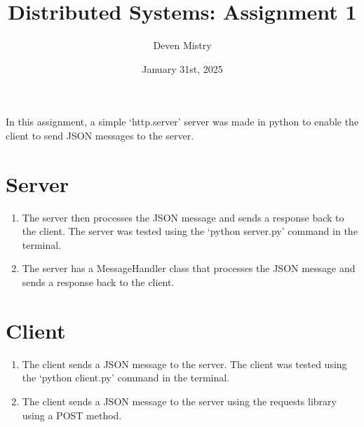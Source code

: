 \documentclass{article}
\title{Distributed Systems: Assignment 1}
\author{Deven Mistry}
\date{January 31st, 2025}
\begin{document}
\maketitle

In this assignment, a simple `http.server' server was made in python to enable the client to send JSON messages to the server.

\section*{Server}

\begin{enumerate}
    \item The server then processes the JSON message and sends a response back to the client. The server was tested using the `python server.py' command in the terminal.
    \item The server has a MessageHandler class that processes the JSON message and sends a response back to the client.
\end{enumerate}

\section*{Client}

\begin{enumerate}
    \item The client sends a JSON message to the server. The client was tested using the `python client.py' command in the terminal.
    \item The client sends a JSON message to the server using the requests library using a POST method.
\end{enumerate}
\end{document}
